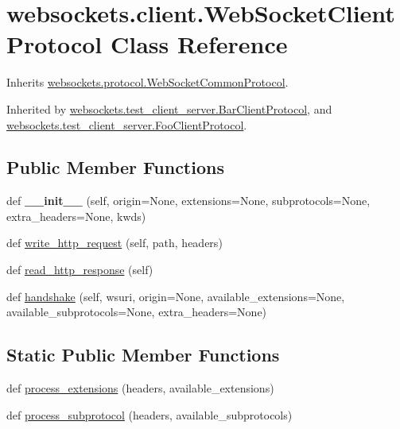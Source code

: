 \hypertarget{classwebsockets_1_1client_1_1_web_socket_client_protocol}{}\section{websockets.\+client.\+Web\+Socket\+Client\+Protocol Class Reference}
\label{classwebsockets_1_1client_1_1_web_socket_client_protocol}


Inherits \hyperlink{classwebsockets_1_1protocol_1_1_web_socket_common_protocol}{websockets.\+protocol.\+Web\+Socket\+Common\+Protocol}.



Inherited by \hyperlink{classwebsockets_1_1test__client__server_1_1_bar_client_protocol}{websockets.\+test\+\_\+client\+\_\+server.\+Bar\+Client\+Protocol}, and \hyperlink{classwebsockets_1_1test__client__server_1_1_foo_client_protocol}{websockets.\+test\+\_\+client\+\_\+server.\+Foo\+Client\+Protocol}.

\subsection*{Public Member Functions}
\begin{DoxyCompactItemize}
\item 
\mbox{\label{classwebsockets_1_1client_1_1_web_socket_client_protocol_ac639bb6af38a5e00ec3a6a5f0e51ce73}} 
def {\bfseries \+\_\+\+\_\+init\+\_\+\+\_\+} (self, origin=None, extensions=None, subprotocols=None, extra\+\_\+headers=None, kwds)
\item 
def \hyperlink{classwebsockets_1_1client_1_1_web_socket_client_protocol_a9e0266ebfc4d025fa7c2ddb664e4b71d}{write\+\_\+http\+\_\+request} (self, path, headers)
\item 
def \hyperlink{classwebsockets_1_1client_1_1_web_socket_client_protocol_a732337785ebbdabc1202cf4535ebae8f}{read\+\_\+http\+\_\+response} (self)
\item 
def \hyperlink{classwebsockets_1_1client_1_1_web_socket_client_protocol_a8f6a8cb75ab7e2437f69acd292632e25}{handshake} (self, wsuri, origin=None, available\+\_\+extensions=None, available\+\_\+subprotocols=None, extra\+\_\+headers=None)
\end{DoxyCompactItemize}
\subsection*{Static Public Member Functions}
\begin{DoxyCompactItemize}
\item 
def \hyperlink{classwebsockets_1_1client_1_1_web_socket_client_protocol_a8eb91cac7cf0e06122efee88b4819933}{process\+\_\+extensions} (headers, available\+\_\+extensions)
\item 
def \hyperlink{classwebsockets_1_1client_1_1_web_socket_client_protocol_a840e626c12cdd9a5ce9ccabfa9eba72f}{process\+\_\+subprotocol} (headers, available\+\_\+subprotocols)
\end{DoxyCompactItemize}
